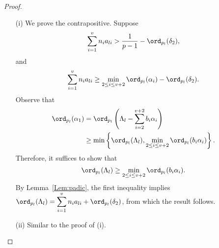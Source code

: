 {\begin{proof} \
\begin{enumerate}
\item[(i)] We prove the contrapositive. Suppose
\[\sum_{i = 1}^v n_i a_{li} > \frac{1}{p-1} - \ord_{p_l}(\delta_2), \]
and
\[\sum_{i = 1}^v n_i a_{li}  \geq \displaystyle \min_{2 \leq i \leq v+2} \ord_{p_l}(\alpha_{i}) - \ord_{p_l}(\delta_2).\]
Observe that
\[\begin{split}
\ord_{p_l}(\alpha_{1}) 	
	& = \ord_{p_l}\left( \Lambda_{l} - \sum_{i = 2}^{v+2}b_i\alpha_{i}\right) \\
	& \geq \min\left\{ \ord_{p_l}(\Lambda_{l}), \min_{2 \leq i \leq v+2} \ord_{p_l}(b_i\alpha_{i})\right\}.
\end{split}\]
Therefore, it suffices to show that 
\[\ord_{p_l}(\Lambda_{l}) \geq \min_{2 \leq i \leq v+2} \ord_{p_l}(b_i\alpha_{i}).\]
By Lemma~\ref{Lem:padic}, the first inequality implies $\ord_{p_l}(\Lambda_{l}) = \displaystyle \sum_{i = 1}^v n_ia_{li} + \ord_{p_l}(\delta_2)$, from which the result follows. 

\item[(ii)] Similar to the proof of (i).
\end{enumerate}
\end{proof}


}
